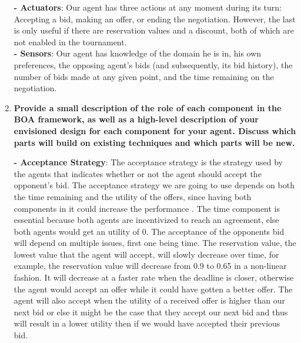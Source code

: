 \documentclass{article}
\begin{document}
\begin{enumerate}[label=(\alph*)]
\textbf{- Actuators}: Our agent has three actions at any moment during its turn: Accepting a bid, making an offer, or ending the negotiation. However, the last is only useful if there are reservation values and a discount, both of which are not enabled in the tournament.\\

\textbf{- Sensors}:  Our agent has knowledge of the domain he is in, his own preferences, the opposing agent's bids (and subsequently, its bid history), the number of bids made at any given point, and the time remaining on the negotiation.\\

\begin{comment}
We would like if our agent were above-average, being able to at least get 60\% utility on any given negotiation. Given that we are using the Genius API to develop our negotiation agent, it should be able to work in any of the available domains, and against any type of opponent. The 3 actions an agent can do in a negotiation are: Make a bid, accept an opponent's bid or end the negotiation altogether. Our agent has knowledge of the domain he is in, his own preferences, the opposing agent's bids (and subsequently, its bid history), the number of bids made at any given point, and the time remaining on the negotiation.
\end{comment}

\item
\textbf{Provide a small description of the role of each component in the BOA
framework, as well as a high-level description of your envisioned design for each component for your agent. Discuss which parts will build on existing techniques and which parts will be new.}


\textbf{- Acceptance Strategy}: The acceptance strategy is the strategy used by the agents that indicates whether or not the agent should accept the opponent's bid. The acceptance strategy we are going to use depends on both the time remaining and the utility of the offers, since having both components in it could increase the performance \cite{baarslag}. The time component is essential because both agents are incentivized to reach an agreement, else both agents would get an utility of 0. The acceptance of the opponents bid will depend on multiple issues, first one being time. The reservation value, the lowest value that the agent will accept, will slowly decrease over time, for example, the reservation value will decrease from 0.9 to 0.65 in a non-linear fashion. It will decrease at a faster rate when the deadline is closer, otherwise the agent would accept an offer while it could have gotten a better offer. The agent will also accept when the utility of a received offer is higher than our next bid or else it might be the case that they accept our next bid and thus will result in a lower utility then if we would have accepted their previous bid.


\end{enumerate}
\end{document}
